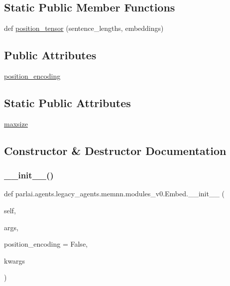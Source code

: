 \subsection*{Static Public Member Functions}
\begin{DoxyCompactItemize}
\item 
def \hyperlink{classparlai_1_1agents_1_1legacy__agents_1_1memnn_1_1modules__v0_1_1Embed_a40a4aebba88622f6734725da0a1fd12d}{position\+\_\+tensor} (sentence\+\_\+lengths, embeddings)
\end{DoxyCompactItemize}
\subsection*{Public Attributes}
\begin{DoxyCompactItemize}
\item 
\hyperlink{classparlai_1_1agents_1_1legacy__agents_1_1memnn_1_1modules__v0_1_1Embed_ac0a34fe405b50e9d36e366d7b3b3913f}{position\+\_\+encoding}
\end{DoxyCompactItemize}
\subsection*{Static Public Attributes}
\begin{DoxyCompactItemize}
\item 
\hyperlink{classparlai_1_1agents_1_1legacy__agents_1_1memnn_1_1modules__v0_1_1Embed_ab1dcd9286ae9605d47d10760a1ed1676}{maxsize}
\end{DoxyCompactItemize}


\subsection{Constructor \& Destructor Documentation}
\mbox{\label{classparlai_1_1agents_1_1legacy__agents_1_1memnn_1_1modules__v0_1_1Embed_aee1b369b4a7f6b23788e30e2dc3e439f}} 
\subsubsection{\texorpdfstring{\+\_\+\+\_\+init\+\_\+\+\_\+()}{\_\_init\_\_()}}
{\footnotesize\ttfamily def parlai.\+agents.\+legacy\+\_\+agents.\+memnn.\+modules\+\_\+v0.\+Embed.\+\_\+\+\_\+init\+\_\+\+\_\+ (\begin{DoxyParamCaption}\item[{}]{self,  }\item[{}]{args,  }\item[{}]{position\+\_\+encoding = {\ttfamily False},  }\item[{}]{kwargs }\end{DoxyParamCaption})}



